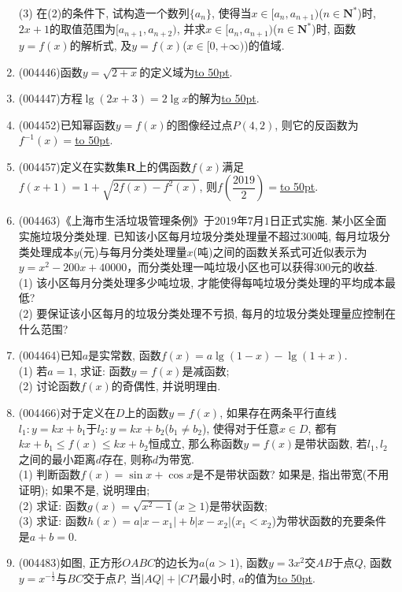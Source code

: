 \documentclass[10pt,a4paper]{article}
\newcommand{\blank}[1]{\underline{\hbox to #1pt{}}}
\begin{document}
\begin{enumerate}[1.]
(3) 在(2)的条件下, 试构造一个数列$\{a_n\}$, 使得当$x\in [a_n,{a_{n+1}})$($n\in \mathbf{N}^*$)时, $2x+1$的取值范围为$[{a_{n+1}},{a_{n+2}})$, 并求$x\in [a_n,{a_{n+1}})$($n\in \mathbf{N}^*$)时, 函数$y=f(x)$的解析式, 及$y=f(x)$($x\in [0,+\infty)$)的值域.
\item {\tiny (004446)}函数$y=\sqrt{2+x}$的定义域为\blank{50}.
\item {\tiny (004447)}方程$\lg(2x+3)=2\lg x$的解为\blank{50}.
\item {\tiny (004452)}已知幂函数$y=f(x)$的图像经过点$P(4,2)$, 则它的反函数为$f^{-1}(x)=$\blank{50}.
\item {\tiny (004457)}定义在实数集$\mathbf{R}$上的偶函数$f(x)$满足$f(x+1)=1+\sqrt{2f(x)-f^2(x)}$, 则$f(\dfrac{2019}{2})=$\blank{50}.
\item {\tiny (004463)}《上海市生活垃圾管理条例》于$2019$年$7$月$1$日正式实施. 某小区全面实施垃圾分类处理. 已知该小区每月垃圾分类处理量不超过$300$吨, 每月垃圾分类处理成本$y$(元)与每月分类处理量$x$(吨)之间的函数关系式可近似表示为
$y=x^2-200x+40000$，而分类处理一吨垃圾小区也可以获得$300$元的收益.\\
(1) 该小区每月分类处理多少吨垃圾, 才能使得每吨垃圾分类处理的平均成本最低?\\
(2) 要保证该小区每月的垃圾分类处理不亏损, 每月的垃圾分类处理量应控制在什么范围?
\item {\tiny (004464)}已知$a$是实常数, 函数$f(x)=a\lg(1-x)-\lg (1+x)$.\\
(1) 若$a=1$, 求证: 函数$y=f(x)$是减函数;\\
(2) 讨论函数$f(x)$的奇偶性, 并说明理由.
\item {\tiny (004466)}对于定义在$D$上的函数$y=f(x)$, 如果存在两条平行直线$l_1:y=kx+b_1$于$l_2:y=kx+b_2$($b_1\ne b_2$), 使得对于任意$x\in D$, 都有$kx+b_1\le f(x)\le kx+b_2$恒成立, 那么称函数$y=f(x)$是带状函数, 若$l_1,l_2$之间的最小距离$d$存在, 则称$d$为带宽.\\
(1) 判断函数$f(x)=\sin x+\cos x$是不是带状函数? 如果是, 指出带宽(不用证明); 如果不是, 说明理由;\\
(2) 求证: 函数$g(x)=\sqrt{x^2-1}$($x\ge 1$)是带状函数;\\
(3) 求证: 函数$h(x)=a|x-x_1|+b|x-x_2|$($x_1<x_2$)为带状函数的充要条件是$a+b=0$.
\item {\tiny (004483)}如图, 正方形$OABC$的边长为$a$($a>1$), 函数$y=3x^2$交$AB$于点$Q$, 函数$y=x^{-\frac 12}$与$BC$交于点$P$, 当$|AQ|+|CP|$最小时, $a$的值为\blank{50}.
\begin{center}
\begin{tikzpicture}[>=latex]

\end{tikzpicture}
\end{center}
\end{enumerate}
\end{document}
